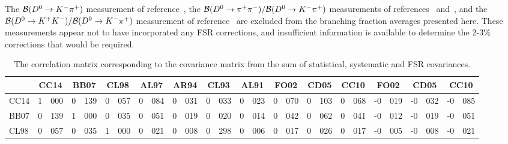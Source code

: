 The ${\cal B}(D^0\to K^-\pi^+)$ measurement of reference~\cite{Coan:1997ye}, the  
${\cal B}(D^0\to \pi^+\pi^-)/{\cal B}(D^0\to K^-\pi^+)$ measurements of 
references~\cite{Aitala:1997ff} 
and~\cite{Csorna:2001ww}, and the 
${\cal B}(D^0\to K^+ K^-)/{\cal B}(D^0\to K^-\pi^+)$ measurement
of reference~\cite{Csorna:2001ww} are excluded from the branching 
fraction averages presented here.
These measurements appear not to have incorporated any FSR corrections, 
and insufficient information
is available to determine the 2-3\% corrections that would be required.

\begin{table}
  \centering 
  \caption{The correlation matrix corresponding to the covariance matrix from the sum of statistical,
  systematic and FSR covariances.}\label{tab:correlations}
  \small
\begin{tabular}{lr@{.}lr@{.}lr@{.}lr@{.}lr@{.}lr@{.}lr@{.}lr@{.}lr@{.}lr@{.}lr@{.}lr@{.}lr@{.}l}
\hline\hline
           & \multicolumn{2}{c}{CC14}
                   & \multicolumn{2}{c}{BB07}
                           & \multicolumn{2}{c}{CL98}
                                   & \multicolumn{2}{c}{AL97}
                                           & \multicolumn{2}{c}{AR94} 
                                                   & \multicolumn{2}{c}{CL93} 
                                                           & \multicolumn{2}{c}{AL91} 
                                                                   & \multicolumn{2}{c}{FO02} 
                                                                           & \multicolumn{2}{c}{CD05} 
                                                                                   & \multicolumn{2}{c}{CC10} 
                                                                                           & \multicolumn{2}{c}{FO02}
                                                                                                    & \multicolumn{2}{c}{CD05} 
                                                                                                            & \multicolumn{2}{c}{CC10} \\ \hline
CC14 & 1&000 & 0&139 & 0&057 & 0&084 & 0&031 & 0&033 & 0&023 & 0&070 & 0&103 & 0&068 &-0&019 &-0&032 &-0&085 \\
BB07 & 0&139 & 1&000 & 0&035 & 0&051 & 0&019 & 0&020 & 0&014 & 0&042 & 0&062 & 0&041 &-0&012 &-0&019 &-0&051 \\
CL98 & 0&057 & 0&035 & 1&000 & 0&021 & 0&008 & 0&298 & 0&006 & 0&017 & 0&026 & 0&017 &-0&005 &-0&008 &-0&021 \\

\end{tabular}
\end{table}

